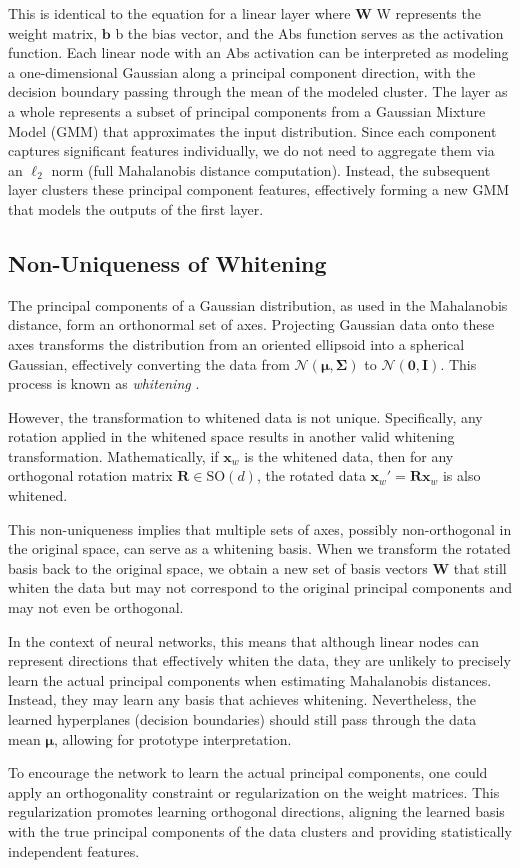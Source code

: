 This is identical to the equation for a linear layer where 
$\boldsymbol{W}$
W represents the weight matrix, 
$\boldsymbol{b}$
b the bias vector, and the Abs function serves as the activation function. Each linear node with an Abs activation can be interpreted as modeling a one-dimensional Gaussian along a principal component direction, with the decision boundary passing through the mean of the modeled cluster. The layer as a whole represents a subset of principal components from a Gaussian Mixture Model (GMM) that approximates the input distribution. Since each component captures significant features individually, we do not need to aggregate them via an $\ell_2$ norm (full Mahalanobis distance computation). Instead, the subsequent layer clusters these principal component features, effectively forming a new GMM that models the outputs of the first layer.

\subsection{Non-Uniqueness of Whitening}

The principal components of a Gaussian distribution, as used in the Mahalanobis distance, form an orthonormal set of axes. Projecting Gaussian data onto these axes transforms the distribution from an oriented ellipsoid into a spherical Gaussian, effectively converting the data from \(\mathcal{N}(\boldsymbol{\mu}, \boldsymbol{\Sigma})\) to \(\mathcal{N}(\mathbf{0}, \mathbf{I})\). This process is known as \emph{whitening} \citep[Section 12.1.3]{bishop2006pattern}.

However, the transformation to whitened data is not unique. Specifically, any rotation applied in the whitened space results in another valid whitening transformation. Mathematically, if \(\mathbf{x}_w\) is the whitened data, then for any orthogonal rotation matrix \(\mathbf{R} \in \text{SO}(d)\), the rotated data \(\mathbf{x}_w' = \mathbf{R} \mathbf{x}_w\) is also whitened.

This non-uniqueness implies that multiple sets of axes, possibly non-orthogonal in the original space, can serve as a whitening basis. When we transform the rotated basis back to the original space, we obtain a new set of basis vectors \(\mathbf{W}\) that still whiten the data but may not correspond to the original principal components and may not even be orthogonal.

In the context of neural networks, this means that although linear nodes can represent directions that effectively whiten the data, they are unlikely to precisely learn the actual principal components when estimating Mahalanobis distances. Instead, they may learn any basis that achieves whitening. Nevertheless, the learned hyperplanes (decision boundaries) should still pass through the data mean \(\boldsymbol{\mu}\), allowing for prototype interpretation.

To encourage the network to learn the actual principal components, one could apply an orthogonality constraint or regularization on the weight matrices. This regularization promotes learning orthogonal directions, aligning the learned basis with the true principal components of the data clusters and providing statistically independent features.
